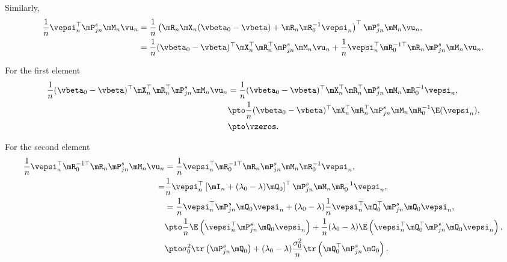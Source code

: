\documentclass[english,12pt]{book}\usepackage[]{graphicx}\usepackage[]{xcolor}
\begin{document}
\begin{subappendices}
Similarly, 
\begin{equation}
\begin{aligned}
\frac{1}{n}\vepsi_n^\top \mP_{jn}^s\mM_n\vu_n & = \frac{1}{n}\left(\mR_n\mX_n(\vbeta_0 - \vbeta) + \mR_n\mR_0^{-1}\vepsi_n\right)^\top\mP_{jn}^s\mM_n\vu_n, \\
& = \frac{1}{n}(\vbeta_0 - \vbeta)^\top\mX_n^\top\mR_n^\top \mP_{jn}^s\mM_n\vu_n + \frac{1}{n}\vepsi_n^\top\mR_0^{-1\top}\mR_n\mP_{jn}^s\mM_n\vu_n.
\end{aligned}
\end{equation}

For the first element
\begin{equation*}
\begin{aligned}
  \frac{1}{n}(\vbeta_0 - \vbeta)^\top\mX_n^\top\mR_n^\top \mP_{jn}^s\mM_n\vu_n & = \frac{1}{n}(\vbeta_0 - \vbeta)^\top\mX_n^\top\mR_n^\top \mP_{jn}^s\mM_n\mR_0^{-1}\vepsi_n,\\
  & \pto \frac{1}{n}(\vbeta_0 - \vbeta)^\top\mX_n^\top\mR_n^\top \mP_{jn}^s\mM_n\mR_0^{-1}\E(\vepsi_n), \\
  & \pto \vzeros.
  \end{aligned}
\end{equation*}

For the second element
\begin{equation*}
\begin{aligned}
  \frac{1}{n}\vepsi_n^\top\mR_0^{-1\top}\mR_n\mP_{jn}^s\mM_n\vu_n & = \frac{1}{n}\vepsi_n^\top\mR_0^{-1\top}\mR_n\mP_{jn}^s\mM_n\mR_0^{-1}\vepsi_n,  \\
  = & \frac{1}{n}\vepsi_n^\top\left[\mI_n + (\lambda_0-\lambda)\mQ_0\right]^\top\mP_{jn}^s\mM_n\mR_0^{-1}\vepsi_n, \\
  & = \frac{1}{n}\vepsi_n^\top\mP_{jn}^s\mQ_0\vepsi_n + (\lambda_0 - \lambda)\frac{1}{n}\vepsi_n^\top\mQ_0^\top\mP_{jn}^s\mQ_0\vepsi_n, \\
  & \pto \frac{1}{n}\E\left(\vepsi_n^\top\mP_{jn}^s\mQ_0\vepsi_n\right)  + \frac{1}{n} (\lambda_0 - \lambda) \E\left(\vepsi_n^\top\mQ_0^\top\mP_{jn}^s\mQ_0\vepsi_n \right),\\
  & \pto \sigma_0^2 \tr\left(\mP_{jn}^{s}\mQ_0\right) + (\lambda_0- \lambda)\frac{\sigma_0^2}{n}\tr\left(\mQ_0^\top\mP_{jn}^s\mG_0\right).
\end{aligned}
\end{equation*}


\end{subappendices}
\end{document}
